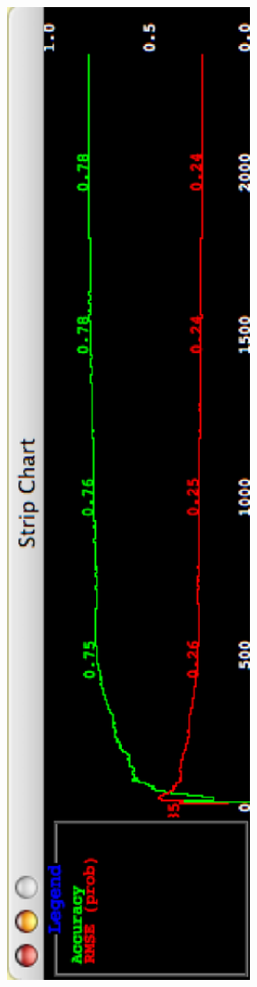 \begin{center}
  \includegraphics[angle=270,width=12cm]{images/knowledgeflow/IncrementalChart.eps}
\end{center}

